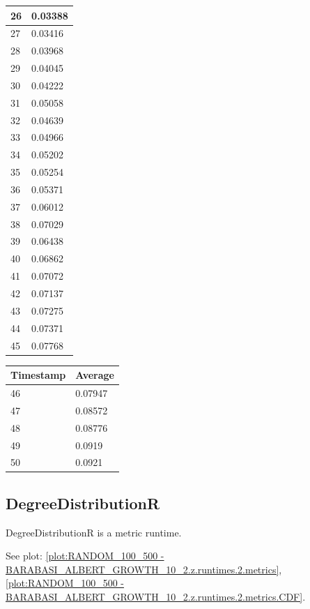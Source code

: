 \begin{tabular}{|l||l|}
	26 & 0.03388 \\ \hline
	27 & 0.03416 \\ \hline
	28 & 0.03968 \\ \hline
	29 & 0.04045 \\ \hline
	30 & 0.04222 \\ \hline
	31 & 0.05058 \\ \hline
	32 & 0.04639 \\ \hline
	33 & 0.04966 \\ \hline
	34 & 0.05202 \\ \hline
	35 & 0.05254 \\ \hline
	36 & 0.05371 \\ \hline
	37 & 0.06012 \\ \hline
	38 & 0.07029 \\ \hline
	39 & 0.06438 \\ \hline
	40 & 0.06862 \\ \hline
	41 & 0.07072 \\ \hline
	42 & 0.07137 \\ \hline
	43 & 0.07275 \\ \hline
	44 & 0.07371 \\ \hline
	45 & 0.07768 \\ \hline
\end{tabular}
\begin{tabular}{|l||l|}
\hline
	\textbf{Timestamp} & \textbf{Average} \\ \hline
	46 & 0.07947 \\ \hline
	47 & 0.08572 \\ \hline
	48 & 0.08776 \\ \hline
	49 & 0.0919 \\ \hline
	50 & 0.0921 \\ \hline
\end{tabular}

\subsection{DegreeDistributionR}
DegreeDistributionR is a metric runtime.

See plot: \ref{plot:RANDOM_100_500 - BARABASI_ALBERT_GROWTH_10_2.z.runtimes.2.metrics}, \ref{plot:RANDOM_100_500 - BARABASI_ALBERT_GROWTH_10_2.z.runtimes.2.metrics.CDF}.

